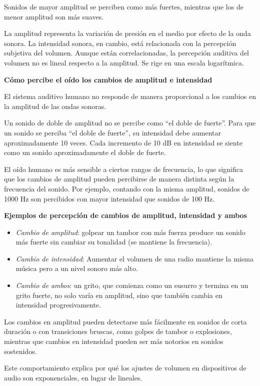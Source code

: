 Sonidos de mayor amplitud se perciben como más fuertes, mientras que los de menor amplitud son más suaves.

\begin{tcolorbox}[title=Relación entre Amplitud e Intensidad,colback=gray!10, colframe=gray!50, sharp corners=south]
La amplitud representa la variación de presión en el medio por efecto de la onda sonora. La intensidad sonora, en cambio, está relacionada con la percepción subjetiva del volumen. Aunque están correlacionadas, la percepción auditiva del volumen no es lineal respecto a la amplitud. Se rige en una escala logarítmica.\vspace{10pt}

\parbox{\textwidth}{\textbf{Cómo percibe el oído los cambios de amplitud e intensidad}}
El sistema auditivo humano no responde de manera proporcional a los cambios en la amplitud de las ondas sonoras.

Un sonido de doble de amplitud no se percibe como ``el doble de fuerte''. Para que un sonido se perciba ``el doble de fuerte'', su intensidad debe aumentar aproximadamente 10 veces. Cada incremento de 10 dB en intensidad se siente como un sonido aproximadamente el doble de fuerte.

El oído humano es más sensible a ciertos rangos de frecuencia, lo que significa que los cambios de amplitud pueden percibirse de manera distinta según la frecuencia del sonido. Por ejemplo, contando con la misma amplitud, sonidos de 1000 Hz son percibidos con mayor intensidad que sonidos de 100 Hz.\vspace{10pt}

\parbox{\textwidth}{\textbf{Ejemplos de percepción de cambios de amplitud, intensidad y ambos}}
\begin{itemize}
    \item \emph{Cambio de amplitud}: golpear un tambor con más fuerza produce un sonido más fuerte sin cambiar su tonalidad (se mantiene la frecuencia).
    \item \emph{Cambio de intensidad}: Aumentar el volumen de una radio mantiene la misma música pero a un nivel sonoro más alto.
    \item \emph{Cambio de ambos}: un grito, que comienza como un susurro y termina en un grito fuerte, no solo varía en amplitud, sino que también cambia en intensidad progresivamente.
\end{itemize}

Los cambios en amplitud pueden detectarse más fácilmente en sonidos de corta duración o con transiciones bruscas, como golpes de tambor o explosiones, mientras que cambios en intensidad pueden ser más notorios en sonidos sostenidos.

Este comportamiento explica por qué los ajustes de volumen en dispositivos de audio son exponenciales, en lugar de lineales.
\end{tcolorbox}

